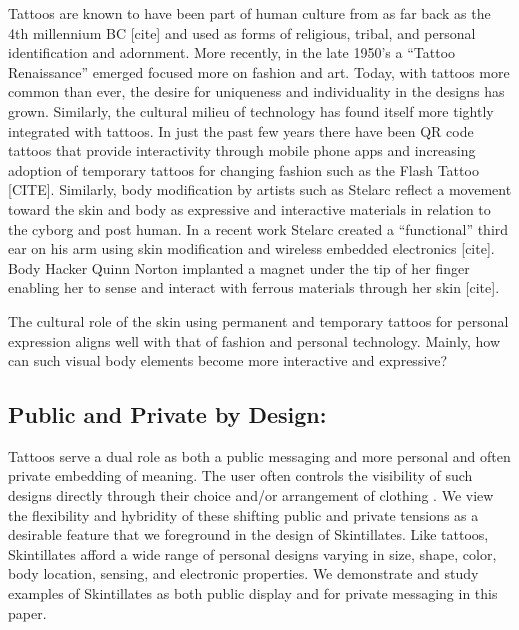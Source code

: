 \documentclass{sigchi}
\begin{document}
Tattoos are known to have been part of human culture from as far back as the 4th millennium BC [cite] and used as forms of religious, tribal, and personal identification and adornment.  More recently, in the late 1950’s a “Tattoo Renaissance” emerged focused more on fashion and art. Today, with tattoos more common than ever, the desire for uniqueness and individuality in the designs has grown.  Similarly, the cultural milieu of technology has found itself more tightly integrated with tattoos. In just the past few years there have been QR code tattoos that provide interactivity through mobile phone apps and increasing adoption of temporary tattoos for changing fashion such as the Flash Tattoo [CITE]. 
Similarly, body modification by artists such as Stelarc reflect a movement toward the skin and body as expressive and interactive materials in relation to the cyborg and post human.  In a recent work Stelarc created a “functional” third ear on his arm using skin modification and wireless embedded electronics [cite].  Body Hacker Quinn Norton implanted a magnet under the tip of her finger enabling her to sense and interact with ferrous materials through her skin [cite].

The cultural role of the skin using permanent and temporary tattoos for personal expression aligns well with that of fashion and personal technology.  Mainly, how can such visual body elements become more interactive and expressive?


\subsection{Public and Private by Design:}
Tattoos serve a dual role as both a public messaging and more personal and often private embedding of meaning.  The user often controls the visibility of such designs directly through their choice and/or arrangement of clothing \cite{Doss:2009ee,McLeod:2014ua}. We view the flexibility and hybridity of these shifting public and private tensions as a desirable feature that we foreground in the design of Skintillates.   Like tattoos, Skintillates afford a wide range of personal designs varying in size, shape, color, body location, sensing, and electronic properties. We demonstrate and study examples of Skintillates as both public display and for private messaging in this paper. 
\end{document}
